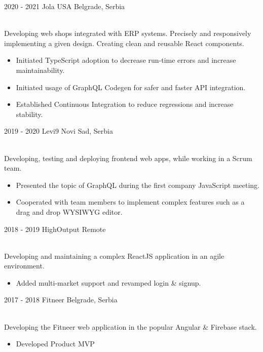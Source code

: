 \documentclass[]{cv-style}          %
\begin{document}
\begin{entrylist}
  \entry
  {2020 - 2021}
  {Jola USA}
  {Belgrade, Serbia}
  {\\
    Developing web shops integrated with ERP systems. Precisely and responsively implementing a given design. Creating clean and reusable React components.\\
    \subtitle{Detailed achievements:}
    \begin{itemize}
      \item Initiated TypeScript adoption to decrease run-time errors and increase maintainability.
      \item Initiated usage of GraphQL Codegen for safer and faster API integration.
      \item Established Continuous Integration to reduce regressions and increase stability.
    \end{itemize}}
  \entry
  {2019 - 2020}
  {Levi9}
  {Novi Sad, Serbia}
  {\\
    Developing, testing and deploying frontend web apps, while working in a Scrum team.\\
    \subtitle{Detailed achievements:}
    \begin{itemize}
      \item Presented the topic of GraphQL during the first company JavaScript meeting.
      \item Cooperated with team members to implement complex features such as a drag and drop WYSIWYG editor.
    \end{itemize}}
  \entry
  {2018 - 2019}
  {HighOutput}
  {Remote}
  {\\
    Developing and maintaining a complex ReactJS application in an agile environment.\\
    \subtitle{Detailed achievements:}
    \begin{itemize}
      \item Added multi-market support and revamped login \& signup.
    \end{itemize}}
  \entry
  {2017 - 2018}
  {Fitneer}
  {Belgrade, Serbia}
  {\\
    Developing the Fitneer web application in the popular Angular \& Firebase stack. \\
    \subtitle{Detailed achievements:}
    \begin{itemize}
      \item Developed Product MVP
    \end{itemize}}

\end{entrylist}
\end{document}
